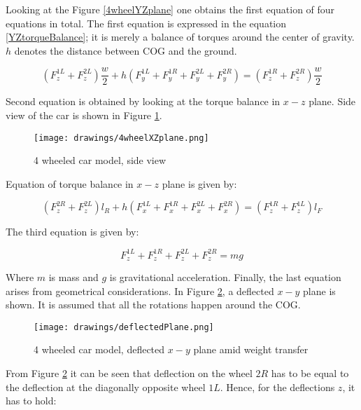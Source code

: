 \documentclass[paper=a4, fontsize=11pt]{scrartcl} %
\numberwithin{equation}{section} %
\numberwithin{figure}{section} %
\numberwithin{table}{section} %
\begin{document}
Looking at the Figure \ref{4wheelYZplane} one obtains the first equation of four equations in total. The first equation is expressed in the equation \ref{YZtorqueBalance}; it is merely a balance of torques around the center of gravity. $h$ denotes the distance between COG and the ground.

\begin{equation}
\left(F^{1L}_z+F^{2L}_z \right)\frac{w}{2} + h\left(F^{1L}_y + F^{1R}_y + F^{2L}_y + F^{2R}_y \right) = \left(F^{1R}_z+F^{2R}_z \right)\frac{w}{2} \label{XZtorqueBalance}
\end{equation} 

Second equation is obtained by looking at the torque balance in $x-z$ plane. Side view of the car is shown in Figure \ref{4wheelXZplane}.

\begin{figure}[h!]
	\centering
	\texttt{[image: drawings/4wheelXZplane.png]}
	\caption{4 wheeled car model, side view}
	\label{4wheelXZplane}
\end{figure}

Equation of torque balance in $x-z$ plane is given by:

\begin{equation}
\left(F^{2R}_z+F^{2L}_z \right)l_R + h\left(F^{1L}_x + F^{1R}_x + F^{2L}_x + F^{2R}_x\right) = \left(F^{1R}_z+F^{1L}_z \right)l_F \label{YZtorqueBalance}
\end{equation}

The third equation is given by:

\begin{equation}
F^{1L}_z+F^{1R}_z + F^{2L}_z + F^{2R}_z = mg\label{gravityBalance}
\end{equation} 

Where $m$ is mass and $g$ is gravitational acceleration. Finally, the last equation arises from geometrical considerations. In Figure \ref{deflectedPlane}, a deflected $x-y$ plane is shown. It is assumed that all the rotations happen around the COG.

\begin{figure}[h!]
	\centering
	\texttt{[image: drawings/deflectedPlane.png]}
	\caption{4 wheeled car model, deflected $x-y$ plane amid weight transfer}
	\label{deflectedPlane}
\end{figure}

From Figure \ref{deflectedPlane} it can be seen that deflection on the wheel $2R$ has to be equal to the deflection at the diagonally opposite wheel $1L$. Hence, for the deflections $z$, it has to hold:
\end{document}
